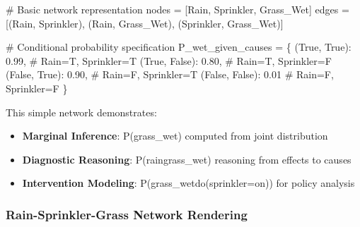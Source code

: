 \documentclass[
  11pt,
  letterpaper,
]{book}
\newenvironment{Shaded}{\begin{snugshade}}{\end{snugshade}}
\newcommand{\CommentTok}[1]{\textcolor[rgb]{0.37,0.37,0.37}{#1}}
\newcommand{\FloatTok}[1]{\textcolor[rgb]{0.68,0.00,0.00}{#1}}
\newcommand{\NormalTok}[1]{\textcolor[rgb]{0.00,0.23,0.31}{#1}}
\newcommand{\OperatorTok}[1]{\textcolor[rgb]{0.37,0.37,0.37}{#1}}
\newcommand{\StringTok}[1]{\textcolor[rgb]{0.13,0.47,0.30}{#1}}
\newcommand{\VariableTok}[1]{\textcolor[rgb]{0.07,0.07,0.07}{#1}}
\providecommand{\tightlist}{%
  \setlength{\itemsep}{0pt}\setlength{\parskip}{0pt}}
\begin{document}
\begin{Shaded}
\begin{Highlighting}[]
\CommentTok{\# Basic network representation}
\NormalTok{nodes }\OperatorTok{=}\NormalTok{ [}\StringTok{\textquotesingle{}Rain\textquotesingle{}}\NormalTok{, }\StringTok{\textquotesingle{}Sprinkler\textquotesingle{}}\NormalTok{, }\StringTok{\textquotesingle{}Grass\_Wet\textquotesingle{}}\NormalTok{]}
\NormalTok{edges }\OperatorTok{=}\NormalTok{ [(}\StringTok{\textquotesingle{}Rain\textquotesingle{}}\NormalTok{, }\StringTok{\textquotesingle{}Sprinkler\textquotesingle{}}\NormalTok{), (}\StringTok{\textquotesingle{}Rain\textquotesingle{}}\NormalTok{, }\StringTok{\textquotesingle{}Grass\_Wet\textquotesingle{}}\NormalTok{), (}\StringTok{\textquotesingle{}Sprinkler\textquotesingle{}}\NormalTok{, }\StringTok{\textquotesingle{}Grass\_Wet\textquotesingle{}}\NormalTok{)]}

\CommentTok{\# Conditional probability specification}
\NormalTok{P\_wet\_given\_causes }\OperatorTok{=}\NormalTok{ \{}
\NormalTok{    (}\VariableTok{True}\NormalTok{, }\VariableTok{True}\NormalTok{): }\FloatTok{0.99}\NormalTok{,    }\CommentTok{\# Rain=T, Sprinkler=T}
\NormalTok{    (}\VariableTok{True}\NormalTok{, }\VariableTok{False}\NormalTok{): }\FloatTok{0.80}\NormalTok{,   }\CommentTok{\# Rain=T, Sprinkler=F  }
\NormalTok{    (}\VariableTok{False}\NormalTok{, }\VariableTok{True}\NormalTok{): }\FloatTok{0.90}\NormalTok{,   }\CommentTok{\# Rain=F, Sprinkler=T}
\NormalTok{    (}\VariableTok{False}\NormalTok{, }\VariableTok{False}\NormalTok{): }\FloatTok{0.01}   \CommentTok{\# Rain=F, Sprinkler=F}
\NormalTok{\}}
\end{Highlighting}
\end{Shaded}

This simple network demonstrates:

\begin{itemize}
\tightlist
\item
  \textbf{Marginal Inference}: P(grass\_wet) computed from joint
  distribution
\item
  \textbf{Diagnostic Reasoning}: P(rain\textbar grass\_wet) reasoning
  from effects to causes
\item
  \textbf{Intervention Modeling}: P(grass\_wet\textbar do(sprinkler=on))
  for policy analysis
\end{itemize}

\subsubsection*{Rain-Sprinkler-Grass Network
Rendering}\label{rain-sprinkler-grass-network-rendering-1}
\end{document}

